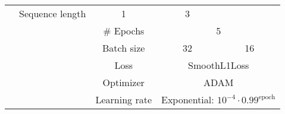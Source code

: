 \begin{table}[h]
\begin{tabular}{|c|c|c|c|p{\wcols}|p{\wcols}|}
        &\multicolumn{2}{c|}{Sequence length}
        &\multicolumn{1}{c|}{1}
        &\multicolumn{1}{c|}{3}
        \\\cline{3-\ncols}
        &
        &\multicolumn{2}{c|}{\# Epochs}
        &\multicolumn{2}{c|}{5}
        \\\cline{3-\ncols}
        &
        &\multicolumn{2}{c|}{Batch size}
        &\multicolumn{1}{c|}{32}
        &\multicolumn{1}{c|}{16}
        \\\cline{3-\ncols}
        &
        &\multicolumn{2}{c|}{Loss}
        &\multicolumn{2}{c|}{SmoothL1Loss}
        \\\cline{3-\ncols}
        &
        &\multicolumn{2}{c|}{Optimizer}
        &\multicolumn{2}{c|}{ADAM}
        \\\cline{3-\ncols}
        &
        &\multicolumn{2}{c|}{Learning rate}
        &\multicolumn{2}{c|}{Exponential: $10^{-4}\cdot 0.99^\text{epoch}$}
        \\\hline
    \end{tabular}
\end{table}


